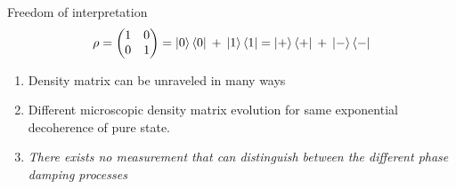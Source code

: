 \documentclass{beamer}
\begin{document}
\begin{frame}{Freedom of interpretation}
	\begin{equation*}
	\rho = 
	\begin{pmatrix}
	1 & 0 \\
	0 & 1
	\end{pmatrix}=
	\ket{0}\bra{0} \hspace{2pt} + \hspace{2pt}\ket{1}\bra{1}=\ket{+}\bra{+} \hspace{2pt}+ \hspace{2pt}\ket{-}\bra{-}
	\end{equation*}
	\begin{enumerate}
		\item Density matrix can be unraveled in many ways
		\item Different microscopic density matrix evolution for same exponential decoherence of pure state.
		\item \emph{There exists no measurement that can distinguish between the different phase damping processes}
	\end{enumerate}
\end{frame}
\end{document}
